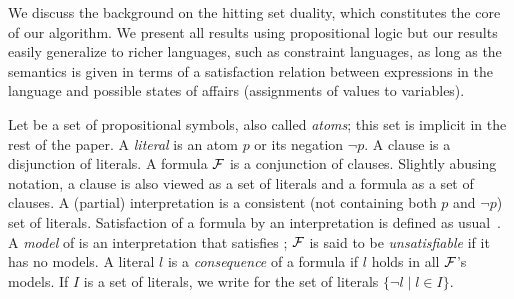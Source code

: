 We discuss the background on the hitting set duality, which constitutes the core of our algorithm. 
We present all results using propositional logic but our results easily generalize to richer languages, such as constraint languages, as long as the semantics is given in terms of a satisfaction relation  between expressions in the language and possible states of affairs (assignments of values to variables).
 
%  
% 
% 

Let \voc be a set of propositional symbols, also called \emph{atoms}; this set is implicit in the rest of the paper. A \emph{literal} is an atom $p$ or its negation $\lnot p$. 
A clause is a disjunction of literals. A formula $\mathcal{F} $ is a conjunction of clauses. 
Slightly abusing notation, a clause is also viewed as a set of literals and a formula as a set of clauses.
A (partial) interpretation is a consistent (not containing both $p$ and $\lnot p$) set of literals. 
Satisfaction of a formula \formula by an interpretation is defined as usual~\cite{faia/2009-185}. 
A \emph{model} of \formula is an interpretation that satisfies \formula; 
$\mathcal{F} $ is said to be \emph{unsatisfiable} if it has no models.
A literal $l$ is a \emph{consequence} of a formula \formula if $l$ holds in all $\mathcal{F} $'s models. %
If $I$ is a set of literals, we write  for the set of literals $\{\lnot l\mid l\in I\}$.

